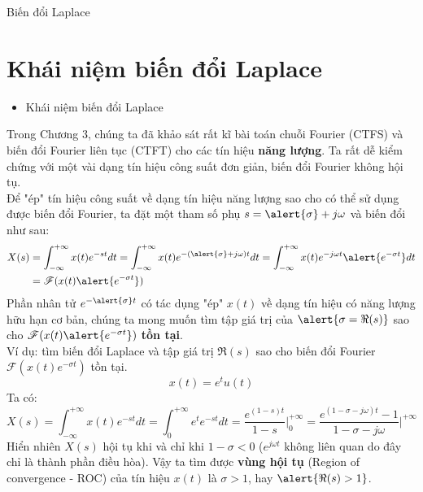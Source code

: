 \documentclass[8pt]{beamer}
\begin{document}
\begin{frame}{Biến đổi Laplace}
\section{Khái niệm biến đổi Laplace}
\begin{itemize}
	\item Khái niệm biến đổi Laplace
\end{itemize}
Trong \alert{Chương 3}, chúng ta đã khảo sát rất kĩ bài toán chuỗi Fourier (CTFS) và biến đổi Fourier liên tục (CTFT) cho các tín hiệu \alert{\textbf{năng lượng}}. Ta rất dễ kiểm chứng với một vài dạng tín hiệu \alert{công suất} đơn giản, \alert{biến đổi Fourier không hội tụ}.
\\ Để "ép" tín hiệu công suất về dạng tín hiệu năng lượng sao cho có thể sử dụng được biến đổi Fourier, ta đặt một tham số phụ $s=\alert{\sigma}+j \omega$ và biến đổi như sau:
\begin{equation*}
\begin{split}
	X(s)&=\int_{-\infty}^{+\infty}x(t)e^{-st}dt=\int_{-\infty}^{+\infty}x(t)e^{-(\alert{\sigma}+j\omega)t}dt=\int_{-\infty}^{+\infty}x(t)e^{-j\omega t}\alert{e^{-\sigma t}}dt\\&=\mathscr{F}(x(t)\alert{e^{-\sigma t}})
\end{split}
\end{equation*}
Phần nhân tử $e^{-\alert{\sigma} t}$ có tác dụng "ép" $x(t)$ về dạng tín hiệu có năng lượng hữu hạn cơ bản, chúng ta mong muốn tìm tập giá trị của $\alert{\sigma=\Re(s)}$ sao cho $\mathscr{F}(x(t)\alert{e^{-\sigma t}})$ \textbf{tồn tại}.
\\ Ví dụ: tìm biến đổi Laplace và tập giá trị $\Re{(s)}$ sao cho biến đổi Fourier $\mathscr{F}(x(t)e^{-\sigma t})$ tồn tại.
$$x(t)=e^{t}u(t)$$
Ta có:
$$X(s)=\int_{-\infty}^{+\infty}x(t)e^{-st}dt=\int_{0}^{+\infty}e^{t}e^{-st}dt=\frac{e^{(1-s)t}}{1-s}\biggr|_{0}^{+\infty}=\frac{e^{(1-\sigma-j\omega)t}-1}{1-\sigma-j\omega}\biggr|^{+\infty}$$
Hiển nhiên $X(s)$ hội tụ khi và chỉ khi $1-\sigma<0$ ($e^{j\omega t}$ không liên quan do đây chỉ là thành phần điều hòa). Vậy ta tìm được \textbf{vùng hội tụ} (Region of convergence - ROC) của tín hiệu $x(t)$ là \alert{$\sigma>1$}, hay $\alert{\Re(s)>1}$.
\end{frame}
\end{document}
